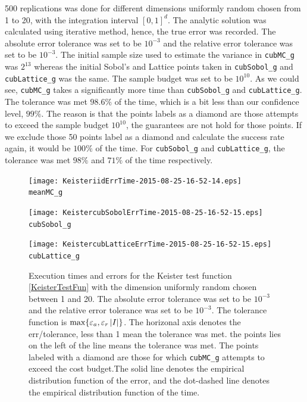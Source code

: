 \documentclass{iitthesis}
\begin{document}
500 replications was done for different dimensions uniformly random chosen from 1 to 20, with the integration interval $[0,1]^d$. The analytic solution was calculated using iterative method, hence, the true error was recorded. The absolute error tolerance was set to be $10^{-3}$ and the relative error tolerance was set to be $10^{-3}$. The initial sample size used to estimate the variance in {\tt cubMC\_g} was $2^{13}$ whereas the initial Sobol's and Lattice points taken in {\tt cubSobol\_g} and {\tt cubLattice\_g} was the same. The sample budget was set to be $10^{10}$. As we could see,  {\tt cubMC\_g} takes a significantly more time than {\tt cubSobol\_g} and {\tt cubLattice\_g}. The tolerance was met $98.6\%$ of the time, which is a bit less than our confidence level, $99\%$. The reason is that the points labels as a diamond are those attempts to exceed the sample budget $10^{10}$,  the guarantees are not hold for those points. If we exclude those 50 points label as a diamond and calculate the success rate again, it would be $100\%$ of the time. For {\tt cubSobol\_g} and {\tt cubLattice\_g}, the tolerance was met $98\%$ and $71\%$ of the time respectively. 

\begin{figure}
\centering
\begin{minipage}{9cm} \centering \texttt{[image: KeisteriidErrTime-2015-08-25-16-52-14.eps]} \\ {\tt meanMC\_g}  \end{minipage}
\begin{minipage}{7cm} \centering \texttt{[image: KeistercubSobolErrTime-2015-08-25-16-52-15.eps]} \\  {\tt cubSobol\_g}\end{minipage}
\begin{minipage}{7cm} \centering \texttt{[image: KeistercubLatticeErrTime-2015-08-25-16-52-15.eps]} \\ {\tt cubLattice\_g} \end{minipage}
\caption{Execution times and errors for the Keister test function \eqref{KeisterTestFun} with the dimension uniformly random chosen between 1 and 20. The absolute error tolerance was set to be $10^{-3}$ and the relative error tolerance was set to be $10^{-3}$.  The tolerance function is $\max\{\varepsilon_a,\varepsilon_r \left \lvert I \right \rvert\}$. The horizonal axis denotes the err/tolerance, less than 1 mean the tolerance was met. the points lies on the left of the line means the tolerance was met. The points labeled with a diamond are those for which  {\tt cubMC\_g}  attempts to exceed the cost budget.The solid line denotes the empirical distribution function of the error, and the dot-dashed line denotes the empirical distribution function of the time.\label{fig:KeisterTestFun} }
\end{figure}
\end{document}
